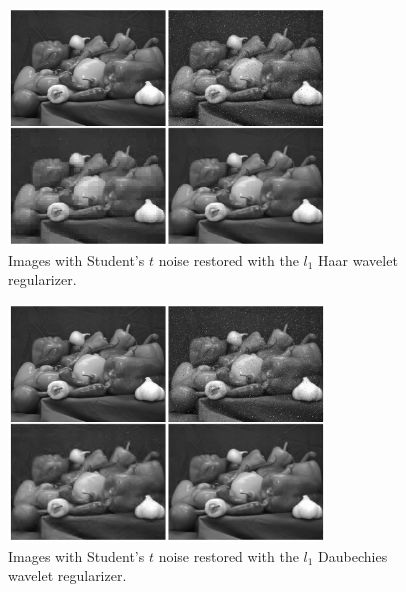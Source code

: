 \documentclass[10pt,a4paper]{article}
\begin{document}
	\begin{figure}[H]
		\begin{center}
			\includegraphics[width = 0.75\textwidth]{../figures/waveletStudentH.pdf} 
		\end{center}
		\caption{Images with Student's $t$ noise restored with the $l_1$ Haar wavelet regularizer.}
		\label{waveletH_student}
	\end{figure}
	
	\begin{figure}[H]
		\begin{center}
			\includegraphics[width = 0.75\textwidth]{../figures/waveletStudentD.pdf} 
		\end{center}
		\caption{Images with Student's $t$ noise restored with the $l_1$ Daubechies wavelet regularizer.}
		\label{waveletD_student}
	\end{figure}
	
\end{document}
